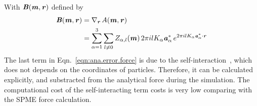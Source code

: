 \documentclass[aps,pre,preprint]{revtex4}
\renewcommand{\v}[1]{\textbf{\textit{#1}}}
\begin{document}
With $\v B(\v m, \v r)$ defined by
\begin{align}\nonumber
  \v B(\v m, \v r)
  &=
  \nabla_{\v r}\,A(\v m, \v r)\\
  &=
  \sum_{\alpha=1}^3\sum_{l\neq 0}
  Z_{\alpha,l}(\v m)\,
  2\pi i l K_\alpha\v a_\alpha^\ast\,e^{2\pi i l K_\alpha\v a^\ast_\alpha\cdot \v r} 
\end{align}
The last term in Eqn.~\eqref{eqn:ana.error.force} is due to the
self-interaction~\cite{cerutti2009staggered, ballenegger2011removal,
  neelov2010interlaced}, which does not depends on the coordinates of
particles. Therefore, it can be calculated explicitly, and substracted
from the analytical force during the simulation. The computational cost of
the self-interacting term costs is very low comparing with the SPME
force calculation.
\end{document}
